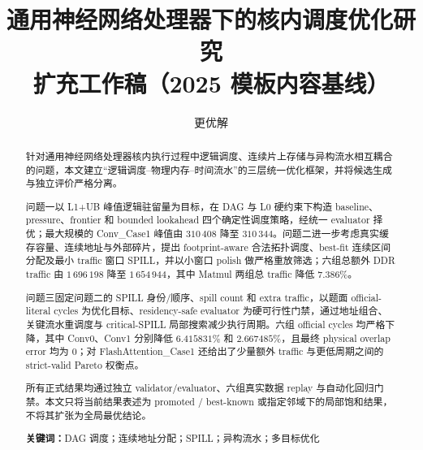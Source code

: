 \documentclass[UTF8,fontset=fandol,12pt]{ctexart}
\title{通用神经网络处理器下的核内调度优化研究\\\large 扩充工作稿（2025 模板内容基线）}
\author{更优解}
\date{}
\begin{document}
\maketitle

\begin{abstract}
针对通用神经网络处理器核内执行过程中逻辑调度、连续片上存储与异构流水相互耦合的问题，本文建立“逻辑调度--物理内存--时间流水”的三层统一优化框架，并将候选生成与独立评价严格分离。

问题一以 L1+UB 峰值逻辑驻留量为目标，在 DAG 与 L0 硬约束下构造 baseline、pressure、frontier 和 bounded lookahead 四个确定性调度策略，经统一 evaluator 择优；最大规模的 Conv\_Case1 峰值由 $310\,408$ 降至 $310\,344$。问题二进一步考虑真实缓存容量、连续地址与外部碎片，提出 footprint-aware 合法拓扑调度、best-fit 连续区间分配及最小 traffic 窗口 SPILL，并以小窗口 polish 做严格重放筛选；六组总额外 DDR traffic 由 $1\,696\,198$ 降至 $1\,654\,944$，其中 Matmul 两组总 traffic 降低 $7.386\%$。

问题三固定问题二的 SPILL 身份/顺序、spill count 和 extra traffic，以题面 official-literal cycles 为优化目标、residency-safe evaluator 为硬可行性门禁，通过地址组合、关键流水重调度与 critical-SPILL 局部搜索减少执行周期。六组 official cycles 均严格下降，其中 Conv0、Conv1 分别降低 $6.415831\%$ 和 $2.667485\%$，且最终 physical overlap error 均为 0；对 FlashAttention\_Case1 还给出了少量额外 traffic 与更低周期之间的 strict-valid Pareto 权衡点。

所有正式结果均通过独立 validator/evaluator、六组真实数据 replay 与自动化回归门禁。本文只将当前结果表述为 promoted / best-known 或指定邻域下的局部饱和结果，不将其扩张为全局最优结论。

\noindent\textbf{关键词：}DAG 调度；连续地址分配；SPILL；异构流水；多目标优化
\end{abstract}

\tableofcontents
\newpage
















\appendix



\end{document}
